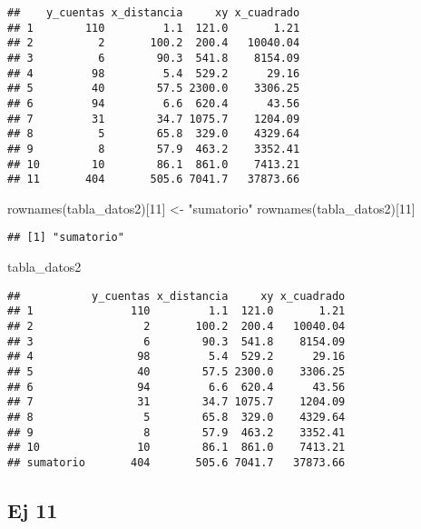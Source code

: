 \documentclass[
]{article}
\newenvironment{Shaded}{\begin{snugshade}}{\end{snugshade}}
\newcommand{\DecValTok}[1]{\textcolor[rgb]{0.00,0.00,0.81}{#1}}
\newcommand{\FunctionTok}[1]{\textcolor[rgb]{0.00,0.00,0.00}{#1}}
\newcommand{\NormalTok}[1]{#1}
\newcommand{\OtherTok}[1]{\textcolor[rgb]{0.56,0.35,0.01}{#1}}
\newcommand{\StringTok}[1]{\textcolor[rgb]{0.31,0.60,0.02}{#1}}
\begin{document}
\begin{verbatim}
##    y_cuentas x_distancia     xy x_cuadrado
## 1        110         1.1  121.0       1.21
## 2          2       100.2  200.4   10040.04
## 3          6        90.3  541.8    8154.09
## 4         98         5.4  529.2      29.16
## 5         40        57.5 2300.0    3306.25
## 6         94         6.6  620.4      43.56
## 7         31        34.7 1075.7    1204.09
## 8          5        65.8  329.0    4329.64
## 9          8        57.9  463.2    3352.41
## 10        10        86.1  861.0    7413.21
## 11       404       505.6 7041.7   37873.66
\end{verbatim}

\begin{Shaded}
\begin{Highlighting}[]
\FunctionTok{rownames}\NormalTok{(tabla\_datos2)[}\DecValTok{11}\NormalTok{] }\OtherTok{\textless{}{-}} \StringTok{"sumatorio"}
\FunctionTok{rownames}\NormalTok{(tabla\_datos2)[}\DecValTok{11}\NormalTok{]}
\end{Highlighting}
\end{Shaded}

\begin{verbatim}
## [1] "sumatorio"
\end{verbatim}

\begin{Shaded}
\begin{Highlighting}[]
\NormalTok{tabla\_datos2}
\end{Highlighting}
\end{Shaded}

\begin{verbatim}
##           y_cuentas x_distancia     xy x_cuadrado
## 1               110         1.1  121.0       1.21
## 2                 2       100.2  200.4   10040.04
## 3                 6        90.3  541.8    8154.09
## 4                98         5.4  529.2      29.16
## 5                40        57.5 2300.0    3306.25
## 6                94         6.6  620.4      43.56
## 7                31        34.7 1075.7    1204.09
## 8                 5        65.8  329.0    4329.64
## 9                 8        57.9  463.2    3352.41
## 10               10        86.1  861.0    7413.21
## sumatorio       404       505.6 7041.7   37873.66
\end{verbatim}

\hypertarget{ej-11}{%
\subsection{Ej 11}\label{ej-11}}
\end{document}
